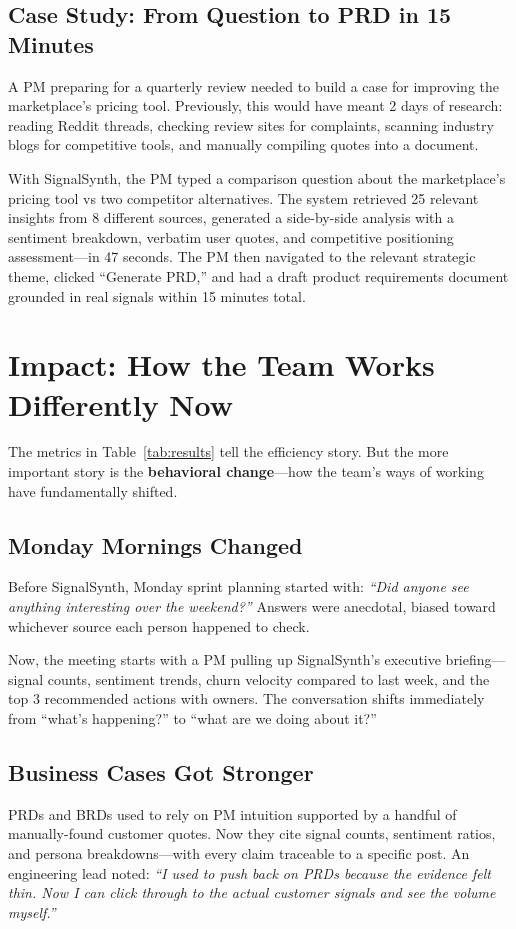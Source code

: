 \documentclass[11pt]{article}
\begin{document}
\subsection{Case Study: From Question to PRD in 15 Minutes}

A PM preparing for a quarterly review needed to build a case for improving the marketplace's pricing tool. Previously, this would have meant 2 days of research: reading Reddit threads, checking review sites for complaints, scanning industry blogs for competitive tools, and manually compiling quotes into a document.

With SignalSynth, the PM typed a comparison question about the marketplace's pricing tool vs two competitor alternatives. The system retrieved 25 relevant insights from 8 different sources, generated a side-by-side analysis with a sentiment breakdown, verbatim user quotes, and competitive positioning assessment---in 47 seconds. The PM then navigated to the relevant strategic theme, clicked ``Generate PRD,'' and had a draft product requirements document grounded in real signals within 15 minutes total.

\section{Impact: How the Team Works Differently Now}

The metrics in Table~\ref{tab:results} tell the efficiency story. But the more important story is the \textbf{behavioral change}---how the team's ways of working have fundamentally shifted.

\subsection{Monday Mornings Changed}
Before SignalSynth, Monday sprint planning started with: \textit{``Did anyone see anything interesting over the weekend?''} Answers were anecdotal, biased toward whichever source each person happened to check.

Now, the meeting starts with a PM pulling up SignalSynth's executive briefing---signal counts, sentiment trends, churn velocity compared to last week, and the top 3 recommended actions with owners. The conversation shifts immediately from ``what's happening?'' to ``what are we doing about it?''

\subsection{Business Cases Got Stronger}
PRDs and BRDs used to rely on PM intuition supported by a handful of manually-found customer quotes. Now they cite signal counts, sentiment ratios, and persona breakdowns---with every claim traceable to a specific post. An engineering lead noted: \textit{``I used to push back on PRDs because the evidence felt thin. Now I can click through to the actual customer signals and see the volume myself.''}
\end{document}
